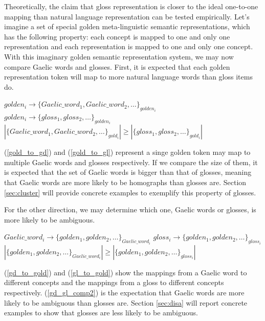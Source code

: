 \documentclass[final]{ua-thesis}
\numberwithin{equation}{section}
\begin{document}
Theoretically, the claim that gloss representation is closer to the ideal one-to-one mapping than natural language representation can be tested empirically. 
Let's imagine a set of special golden meta-linguistic semantic representations, which has the following property: each concept is mapped to one and only one representation and each representation is mapped to one and only one concept. With this imaginary golden semantic representation system, we may now compare Gaelic words and glosses. First, it is expected that each golden representation token will map to more natural language words than gloss items do.

\begin{exe}
\ex
	\begin{xlist}
	\ex \label{gold_to_gd} $golden_i \rightarrow \{Gaelic\_word_1, Gaelic\_word_2, \ldots\}_{golden_i}$
	\ex\label{gold_to_gl} $golden_i \rightarrow \{gloss_1, gloss_2, \ldots\}_{golden_i}$
	\ex\label{gd_gl_comp1}$ |\{Gaelic\_word_1, Gaelic\_word_2, \ldots\}_{gold_i}| \geq |\{gloss_1, gloss_2, \ldots\}_{gold_i}|$
	\end{xlist}
\end{exe}

(\ref{gold_to_gd}) and (\ref{gold_to_gl}) represent a singe golden token may map to multiple Gaelic words and glosses respectively. If we compare the size of them, it is expected that the set of Gaelic words is bigger than that of glosses, meaning that Gaelic words are more likely to be homographs than glosses are. Section \ref{sec:cluster} will provide concrete examples to exemplify this property of glosses. 

For the other direction, we may determine which one, Gaelic words or glosses, is more likely to be ambiguous.   

\begin{exe}
\ex
	\begin{xlist}
	\ex \label{gd_to_gold} $Gaelic\_word_i \rightarrow \{golden_1, golden_2, \ldots\}_{Gaelic\_word_i}$
	\ex \label{gl_to_gold} $gloss_i \rightarrow \{golden_1, golden_2, \ldots\}_{gloss_i}$
	\ex\label{gd_gl_comp2}$ |\{golden_1, golden_2, \ldots\}_{Gaelic\_word_i}| \geq |\{golden_1, golden_2, \ldots\}_{gloss_i}|$
	\end{xlist}
\end{exe}

(\ref{gd_to_gold}) and (\ref{gl_to_gold}) show the mappings from a Gaelic word to different concepts and the mappings from a gloss to different concepts respectively. 
(\ref{gd_gl_comp2}) is the expectation that Gaelic words are more likely to be ambiguous than glosses are. Section \ref{sec:disa} will report concrete examples to show that glosses are less likely to be ambiguous.
\end{document}
